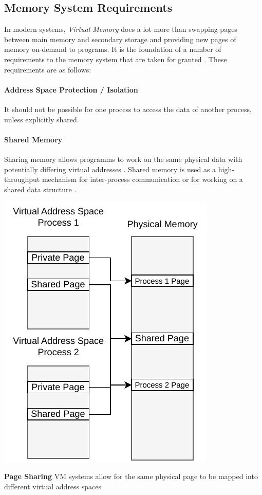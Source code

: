 \subsection{Memory System Requirements}
In modern systems, \textit{Virtual Memory} does a lot more than swapping pages between main memory and secondary
storage and providing new pages of memory on-demand to programs.
It is the foundation of a number of requirements to the memory system that are taken for granted
\cite{jacobSoftwaremanagedAddressTranslation1997}.
These requirements are as follows:


\paragraph{Address Space Protection / Isolation} It should not be possible for one process to access the data
of another process, unless explicitly shared.
\cite{jacobVirtualMemoryContemporary1998}


\paragraph{Shared Memory} Sharing memory allows programms to work on the same physical data with potentially
differing virtual addresses \cite{jacobVirtualMemoryContemporary1998}.
Shared memory is used as a high-throughput mechanism for inter-process communication or for working on
a shared data structure \cite{tanenbaumOS}.

\begin{marginfigure}
    \includegraphics*[width=1\marginparwidth]{figures/fund_share.pdf}
    \caption{\textbf{Page Sharing} VM systems allow for the same physical page to be mapped into different virtual address spaces}
\end{marginfigure}

